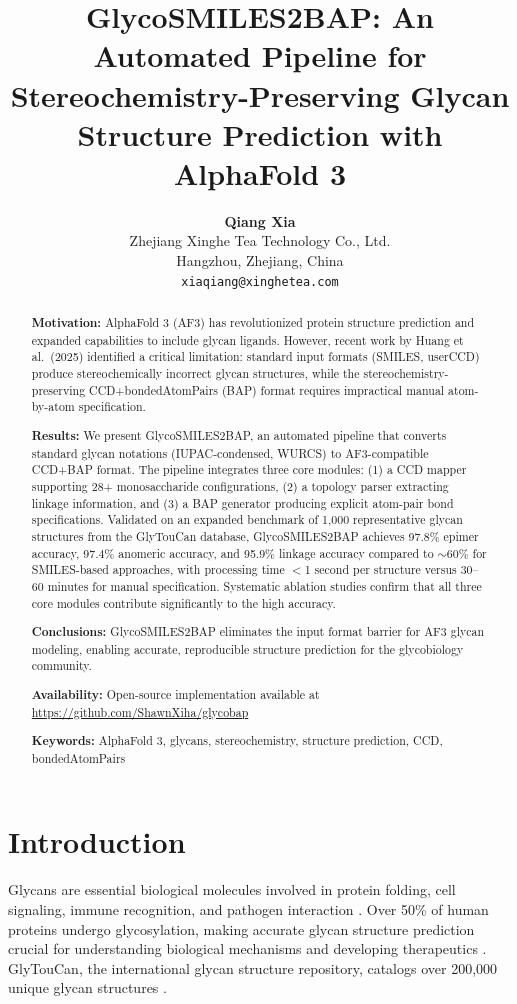 \documentclass[11pt,a4paper]{article}
\title{\textbf{GlycoSMILES2BAP: An Automated Pipeline for Stereochemistry-Preserving Glycan Structure Prediction with AlphaFold 3}}
\author{\textbf{Qiang Xia}\\Zhejiang Xinghe Tea Technology Co., Ltd.\\Hangzhou, Zhejiang, China\\\texttt{xiaqiang@xinghetea.com}}
\date{}
\begin{document}
\maketitle

\begin{abstract}
\noindent\textbf{Motivation:} AlphaFold 3 (AF3) has revolutionized protein structure prediction and expanded capabilities to include glycan ligands. However, recent work by Huang et al.\ (2025) identified a critical limitation: standard input formats (SMILES, userCCD) produce stereochemically incorrect glycan structures, while the stereochemistry-preserving CCD+bondedAtomPairs (BAP) format requires impractical manual atom-by-atom specification.

\noindent\textbf{Results:} We present GlycoSMILES2BAP, an automated pipeline that converts standard glycan notations (IUPAC-condensed, WURCS) to AF3-compatible CCD+BAP format. The pipeline integrates three core modules: (1) a CCD mapper supporting 28+ monosaccharide configurations, (2) a topology parser extracting linkage information, and (3) a BAP generator producing explicit atom-pair bond specifications. Validated on an expanded benchmark of 1,000 representative glycan structures from the GlyTouCan database, GlycoSMILES2BAP achieves 97.8\% epimer accuracy, 97.4\% anomeric accuracy, and 95.9\% linkage accuracy compared to ${\sim}60\%$ for SMILES-based approaches, with processing time $<$1 second per structure versus 30--60 minutes for manual specification. Systematic ablation studies confirm that all three core modules contribute significantly to the high accuracy.

\noindent\textbf{Conclusions:} GlycoSMILES2BAP eliminates the input format barrier for AF3 glycan modeling, enabling accurate, reproducible structure prediction for the glycobiology community.

\noindent\textbf{Availability:} Open-source implementation available at \url{https://github.com/ShawnXiha/glycobap}

\noindent\textbf{Keywords:} AlphaFold 3, glycans, stereochemistry, structure prediction, CCD, bondedAtomPairs
\end{abstract}

\linenumbers

\section{Introduction}

Glycans are essential biological molecules involved in protein folding, cell signaling, immune recognition, and pathogen interaction \citep{varki2017}. Over 50\% of human proteins undergo glycosylation, making accurate glycan structure prediction crucial for understanding biological mechanisms and developing therapeutics \citep{helenius2004}. GlyTouCan, the international glycan structure repository, catalogs over 200,000 unique glycan structures \citep{tiemeyer2016}.
\end{document}
